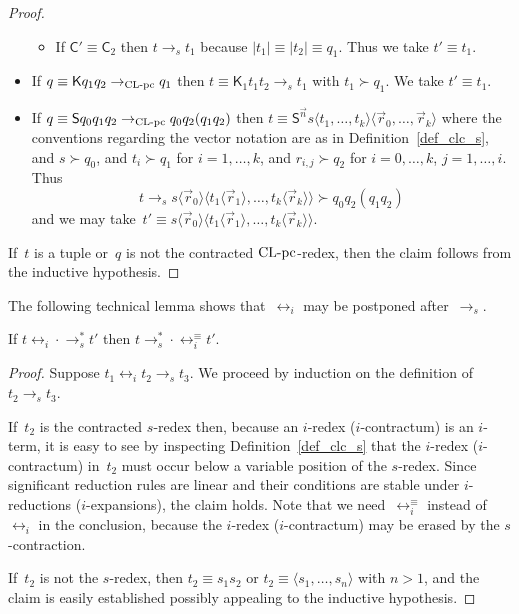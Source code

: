 \documentclass[a4paper,UKenglish]{lipics-v2016}
\newcommand{\Cs}{\mathsf{C}}
\newcommand{\Ss}{\mathsf{S}}
\newcommand{\Ks}{\mathsf{K}}
\newcommand{\eqv}{\ensuremath{\leftrightarrow}}
\newcommand{\erase}[1]{\ensuremath{|#1|}}
\newcommand{\la}{\ensuremath{\langle}}
\newcommand{\ra}{\ensuremath{\rangle}}
\newcommand{\CLCz}{{\mbox{$\text{\rm CL-pc}$}}}
\newcommand{\sCLCz}{\ensuremath{\text{\rm CL-pc}}}
\newcommand{\equiverased}{\succ}
\begin{document}
\begin{proof}
\begin{itemize}
\begin{itemize}
    \item If $\Cs' \equiv \Cs_2$ then $t \to_s t_1$ because
      $\erase{t_1} \equiv \erase{t_2} \equiv q_1$. Thus we take $t'
      \equiv t_1$.
    \end{itemize}
  \item If $q \equiv \Ks q_1 q_2 \to_{\sCLCz} q_1$ then
    $t \equiv \Ks_1 t_1 t_2 \to_s t_1$ with $t_1 \equiverased q_1$. We
    take $t' \equiv t_1$.
  \item If $q \equiv \Ss q_0 q_1 q_2 \to_{\sCLCz} q_0 q_2 (q_1 q_2)$
    then
    $t \equiv \Ss^{\vec{n}} s \la t_1,\ldots,t_k \ra \la
    \vec{r}_0,\ldots,\vec{r}_k \ra$ where the conventions regarding
    the vector notation are as in Definition~\ref{def_clc_s}, and
    $s \equiverased q_0$, and $t_i \equiverased q_1$ for
    $i=1,\ldots,k$, and $r_{i,j} \equiverased q_2$ for $i=0,\ldots,k$,
    $j=1,\ldots,i$. Thus
    \[
    t \to_s s \la \vec{r}_0 \ra \la t_1 \la
    \vec{r}_1 \ra, \ldots, t_{k} \la
    \vec{r}_k \ra \ra \equiverased q_0 q_2
    (q_1 q_2)
    \]
    and we may take~$t' \equiv s \la \vec{r}_0 \ra \la t_1
    \la \vec{r}_{1} \ra, \ldots, t_{k} \la
    \vec{r}_k \ra \ra$.
  \end{itemize}
  If~$t$ is a tuple or~$q$ is not the contracted $\CLCz$-redex, then
  the claim follows from the inductive hypothesis.
\end{proof}

The following technical lemma shows that~$\eqv_i$ may be postponed
after~$\to_s$.

\begin{lemma}\label{lem_i_postpone}
  If $t \eqv_i \cdot \to_s^* t'$ then
  $t \to_s^* \cdot \eqv_i^{\equiv} t'$.
\end{lemma}

\begin{proof}
  Suppose $t_1 \eqv_i t_2 \to_s t_3$. We proceed by induction on the
  definition of $t_2 \to_s t_3$.

  If~$t_2$ is the contracted $s$-redex then, because an $i$-redex
  ($i$-contractum) is an $i$-term, it is easy to see by inspecting
  Definition~\ref{def_clc_s} that the $i$-redex ($i$-contractum)
  in~$t_2$ must occur below a variable position of the
  $s$-redex. Since significant reduction rules are linear and their
  conditions are stable under $i$-reductions ($i$-expansions), the
  claim holds. Note that we need~$\eqv_{i}^{\equiv}$ instead
  of~$\eqv_{i}$ in the conclusion, because the $i$-redex
  ($i$-contractum) may be erased by the $s$-contraction.

  If~$t_2$ is not the $s$-redex, then $t_2 \equiv s_1 s_2$ or $t_2
  \equiv \la s_1,\ldots,s_n \ra$ with $n > 1$, and the claim is easily
  established possibly appealing to the inductive hypothesis.
\end{proof}
\end{document}
